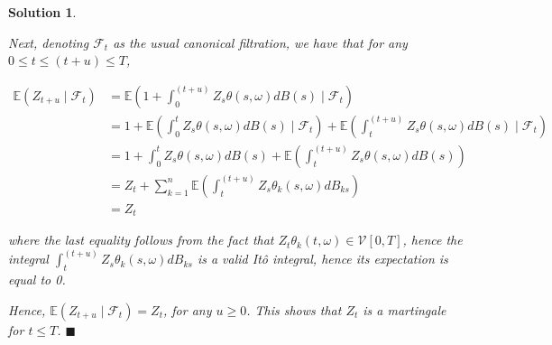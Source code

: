 \documentclass[12pt]{article}
\theoremstyle{problemstyle}
\newtheorem*{solution*}{Solution}
\newcommand{\E}{\mathbb{E}}
\begin{document}
\begin{solution*}
\begin{enumerate}
Next, denoting $\mathcal{F}_t$ as the usual canonical filtration, we have that for any $0 \leq t \leq (t+u) \leq T$,

\begin{align*}
    \E(Z_{t+u} \mid \mathcal{F}_t)
    & = \E\left( 1 + \int_0^{(t+u)} Z_s \theta(s, \omega) dB(s) \mid \mathcal{F}_t \right)\\
    & = 1 + \E\left( \int_0^{t} Z_s \theta(s, \omega) dB(s) \mid \mathcal{F}_t \right) + \E\left( \int_t^{(t+u)} Z_s \theta(s, \omega) dB(s) \mid \mathcal{F}_t \right)\\
    & = 1 + \int_0^{t} Z_s \theta(s, \omega) dB(s) + \E\left( \int_t^{(t+u)} Z_s \theta(s, \omega) dB(s) \right)\\
    & = Z_t + \sum_{k=1}^n \E\left( \int_t^{(t+u)} Z_s \theta_k(s, \omega) dB_{ks} \right)\\
    & = Z_t
\end{align*}

\noindent where the last equality follows from the fact that $Z_t \theta_k(t, \omega) \in \mathcal{V}[0, T]$, hence the integral $\int_t^{(t+u)} Z_s \theta_k(s, \omega) dB_{ks}$ is a valid It\^o integral, hence its expectation is equal to 0.

Hence, $\E(Z_{t+u} \mid \mathcal{F}_t) = Z_t$, for any $u \geq 0$. This shows that $Z_t$ is a martingale for $t \leq T$. \hfill $\blacksquare$

\end{enumerate}







\end{solution*}
\end{document}
